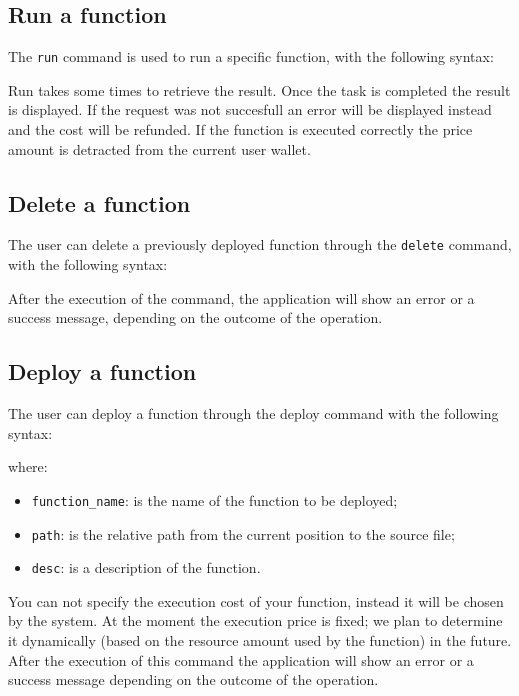 \subsection{Run a function}
The \texttt{run} command is used to run a specific function, with the following syntax: \\
\begin{center}
\end{center}
Run takes some times to retrieve the result. Once the task is completed the result is displayed. If the request was not succesfull an error will be displayed instead and the cost will be refunded. If the function is executed correctly the price amount is detracted from the current user wallet.

\subsection{Delete a function}
The user can delete a previously deployed function through the \texttt{delete} command, with the following syntax:
\begin{center}
\end{center}
After the execution of the command, the application will show an error or a success message, depending on the outcome of the operation.

\subsection{Deploy a function}
The user can deploy a function through the deploy command with the following syntax:
\begin{center}
\end{center}
\noindent where:
\begin{itemize}
	\item \texttt{function\_name}: is the name of the function to be deployed;
	\item \texttt{path}: is the relative path from the current position to the source file;
	\item \texttt{desc}: is a description of the function.
\end{itemize}
You can not specify the execution cost of your function, instead it will be chosen by the system. At the moment the execution price is fixed; we plan to determine it dynamically (based on the resource amount used by the function) in the future. After the execution of this command  the application will show an error or a success message depending on the outcome of the operation.
